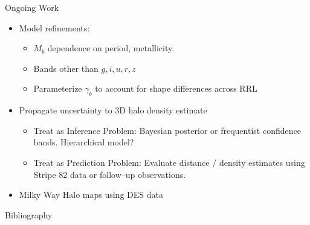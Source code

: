 \documentclass[12pt]{beamer}
\begin{document}
\begin{frame}{Ongoing Work}
\begin{itemize}
\item Model refinements:
\begin{itemize}
\item $M_b$ dependence on period, metallicity.
\item Bands other than $g,i,u,r,z$
\item Parameterize $\gamma_b$ to account for shape differences across RRL
\end{itemize}
\item Propagate uncertainty to 3D halo density estimate
\begin{itemize}
\item Treat as Inference Problem: Bayesian posterior or frequentist confidence bands. Hierarchical model?
\item Treat as Prediction Problem: Evaluate distance / density estimates using Stripe 82 data or follow--up observations.
\end{itemize}
\item Milky Way Halo maps using DES data
\end{itemize}
\end{frame}



\begin{frame}[allowframebreaks]{Bibliography}
 
  \tiny{
  }
\end{frame}
\end{document}
